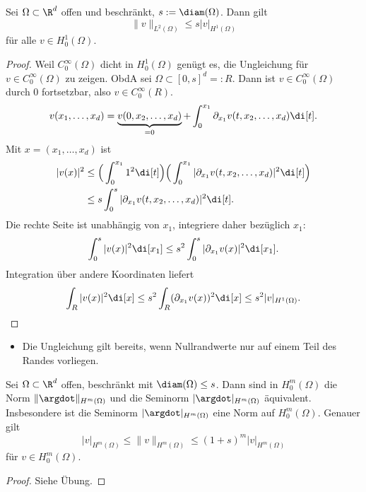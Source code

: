 \begin{st} \label{3.12}
	Sei $\Omega \subset \R^d$ offen und beschränkt, $s := \diam(\Omega)$.
	Dann gilt
	\[
		\|v\|_{L^2(\Omega)} \le s |v|_{H^1(\Omega)}
	\]
	für alle $v \in H_0^1(\Omega)$.
	\begin{proof}
		Weil $C_0^\infty(\Omega)$ dicht in $H_0^1(\Omega)$ genügt es, die Ungleichung für $v \in C_0^\infty(\Omega)$ zu zeigen.
		ObdA sei $\Omega \subset [0,s]^d =: R$.
		Dann ist $v \in C_0^\infty(\Omega)$ durch $0$ fortsetzbar, also $v \in C_0^\infty(R)$.
		\[
			v(x_1, \dotsc, x_d) = \underbrace{v(0, x_2, \dotsc, x_d)}_{=0} +  \int_0^{x_1} \partial_{x_1} v(t, x_2, \dotsc, x_d) \di[t].
		\]
		Mit $x = (x_1, \dotsc, x_d)$ ist
		\begin{align*}
			|v(x)|^2
			&\le \Big(\int_0^{x_1} 1^2 \di[t] \Big) \Big( \int_0^{x_1} |\partial_{x_1} v(t,x_2,\dotsc, x_d)|^2 \di[t] \Big) \\
			&\le s \int_0^s |\partial_{x_1} v(t, x_2, \dotsc, x_d)|^2 \di[t].
		\end{align*}
		Die rechte Seite ist unabhängig von $x_1$, integriere daher bezüglich $x_1$:
		\[
			\int_0^s |v(x)|^2 \di[x_1]
			\le s^2 \int_0^s |\partial_{x_1} v(x)|^2 \di[x_1].
		\]
		Integration über andere Koordinaten liefert
		\[
			\int_R |v(x)|^2 \di[x]
			\le s^2 \int_R (\partial_{x_1} v(x))^2 \di[x]
			\le s^2 |v|_{H^1(\Omega)}.
		\]
	\end{proof}
	\begin{note}
		\begin{itemize}
			\item
				Die Ungleichung gilt bereits, wenn Nullrandwerte nur auf einem Teil des Randes vorliegen.
		\end{itemize}
	\end{note}
\end{st}

\begin{st} \label{3.13}
	Sei $\Omega \subset \R^d$ offen, beschränkt mit $\diam(\Omega) \le s$.
	Dann sind in $H_0^m(\Omega)$ die Norm $\|\argdot\|_{H^m(\Omega)}$ und die Seminorm $|\argdot|_{H^m(\Omega)}$ äquivalent.
	Insbesondere ist die Seminorm $|\argdot|_{H^m(\Omega)}$ eine Norm auf $H_0^m(\Omega)$.
	Genauer gilt
	\[
		|v|_{H^m(\Omega)}
		\le \|v\|_{H^m(\Omega)}
		\le (1 + s)^m |v|_{H^m(\Omega)}
	\]
	für $v \in H_0^m(\Omega)$.
	\begin{proof}
		Siehe Übung.
	\end{proof}
\end{st}


